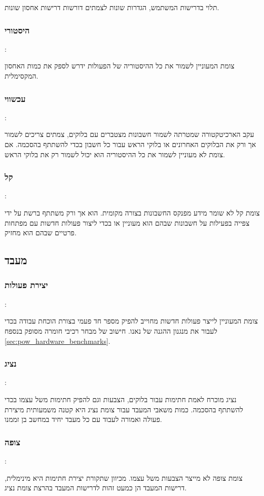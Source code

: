 תלוי בדרישות המשתמש, הגדרות שונות לצמתים דורשות דרישות אחסון שונות.

\subsubsection{היסטורי}:

צומת המעוניין לשמור את כל ההיסטוריה של הפעולות ידרש לספק את כמות האחסון המקסימלית.


\subsubsection{עכשווי}:

עקב הארכיטקטורה שמטרתה לשמור חשבונות מצטברים עם בלוקים, צמתים צריכים לשמור אך ורק את הבלוקים האחרונים או בלוקי הראש עבור כל חשבון בכדי להשתתף בהסכמה.
אם צומת לא מעוניין לשמור את כל ההיסטוריה הוא יכול לשמור רק את בלוקי הראש.

\subsubsection{קל}:

צומת קל לא שומר מידע מפנקס החשבונות בצורה מקומית. הוא אך ורק משתתף ברשת על ידי צפייה בפעילות על חשבונות שבהם הוא מעוניין או בכדי ליצור פעולות חדשות עם מפתחות פרטיים שבהם הוא מחזיק.

\subsection{מעבד}
\subsubsection{יצירת פעולות}:

צומת המעוניין לייצר פעולות חדשות מחוייב להפיק מספר חד פעמי בצורת הוכחת עבודה בכדי לעבור את מנגנון ההגנה של נאנו. חישוב של מבחר רכיבי חומרה מסופק 
בנספח
\ref{sec:pow_hardware_benchmarks}.

\subsubsection{נציג}:

נציג מוכרח לאמת חתימות עבור בלוקים, הצבעות וגם להפיק חתימות משל עצמו בכדי להשתתף בהסכמה.
כמות משאבי המעבד עבור צומת נציג היא קטנה משמעותית מיצירת פעולה ואמורה לעבוד עם כל מעבד יחיד במחשב בן זממנו.

\subsubsection{צופה}:

צומת צופה לא מייצר הצבעות משל עצמו. מכיוון שתקורת יצירת חתימות היא מינימלית, דרישות המעבד הן כמעט זהות 
לדרישות המעבד בהרצת צומת נציג.